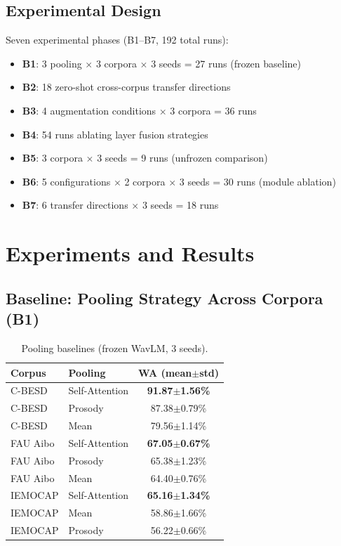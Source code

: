 \documentclass[11pt,a4paper]{article}
\begin{document}
\subsection{Experimental Design}

Seven experimental phases (B1--B7, 192 total runs):
\begin{itemize}
    \item \textbf{B1}: 3 pooling $\times$ 3 corpora $\times$ 3 seeds = 27 runs (frozen baseline)
    \item \textbf{B2}: 18 zero-shot cross-corpus transfer directions
    \item \textbf{B3}: 4 augmentation conditions $\times$ 3 corpora = 36 runs
    \item \textbf{B4}: 54 runs ablating layer fusion strategies
    \item \textbf{B5}: 3 corpora $\times$ 3 seeds = 9 runs (unfrozen comparison)
    \item \textbf{B6}: 5 configurations $\times$ 2 corpora $\times$ 3 seeds = 30 runs (module ablation)
    \item \textbf{B7}: 6 transfer directions $\times$ 3 seeds = 18 runs
\end{itemize}

\section{Experiments and Results}

\subsection{Baseline: Pooling Strategy Across Corpora (B1)}

\begin{table}[h]
\centering
\caption{Pooling baselines (frozen WavLM, 3 seeds).}
\begin{tabular}{llc}
\hline
\textbf{Corpus} & \textbf{Pooling} & \textbf{WA (mean$\pm$std)} \\
\hline
C-BESD & Self-Attention & \textbf{91.87$\pm$1.56\%} \\
C-BESD & Prosody & 87.38$\pm$0.79\% \\
C-BESD & Mean & 79.56$\pm$1.14\% \\
\hline
FAU Aibo & Self-Attention & \textbf{67.05$\pm$0.67\%} \\
FAU Aibo & Prosody & 65.38$\pm$1.23\% \\
FAU Aibo & Mean & 64.40$\pm$0.76\% \\
\hline
IEMOCAP & Self-Attention & \textbf{65.16$\pm$1.34\%} \\
IEMOCAP & Mean & 58.86$\pm$1.66\% \\
IEMOCAP & Prosody & 56.22$\pm$0.66\% \\
\hline
\end{tabular}
\end{table}
\end{document}
